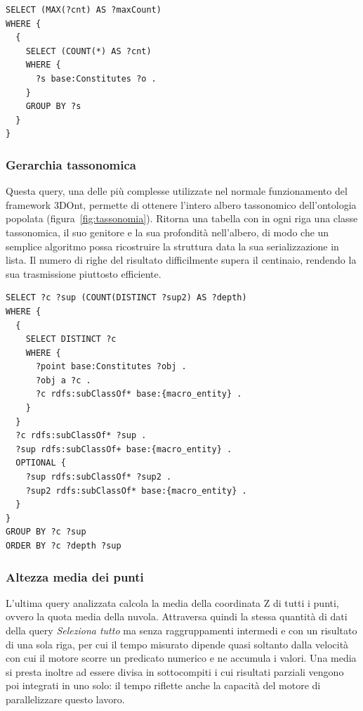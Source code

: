 \begin{lstlisting}[language=SPARQL]
SELECT (MAX(?cnt) AS ?maxCount)
WHERE {
  {
    SELECT (COUNT(*) AS ?cnt)
    WHERE {
      ?s base:Constitutes ?o .
    }
    GROUP BY ?s
  }
}
\end{lstlisting}

\subsubsection{Gerarchia tassonomica}

Questa query, una delle più complesse utilizzate nel normale funzionamento del framework 3DOnt, permette di ottenere
l'intero albero tassonomico dell'ontologia popolata (figura~\ref{fig:tassonomia}). Ritorna una tabella con in ogni riga una classe tassonomica,
il suo genitore e la sua profondità nell'albero, di modo che un semplice algoritmo possa ricostruire la struttura
data la sua serializzazione in lista.
Il numero di righe del risultato difficilmente supera il centinaio, rendendo la sua trasmissione piuttosto efficiente.

\begin{lstlisting}[language=SPARQL]
SELECT ?c ?sup (COUNT(DISTINCT ?sup2) AS ?depth)
WHERE {
  {
    SELECT DISTINCT ?c
    WHERE {
      ?point base:Constitutes ?obj .
      ?obj a ?c .
      ?c rdfs:subClassOf* base:{macro_entity} .
    }
  }
  ?c rdfs:subClassOf* ?sup .
  ?sup rdfs:subClassOf+ base:{macro_entity} .
  OPTIONAL {
    ?sup rdfs:subClassOf* ?sup2 .
    ?sup2 rdfs:subClassOf* base:{macro_entity} .
  }
}
GROUP BY ?c ?sup
ORDER BY ?c ?depth ?sup
\end{lstlisting}


\subsubsection{Altezza media dei punti}

L'ultima query analizzata calcola la media della coordinata Z di tutti i punti, ovvero la quota media della
nuvola. Attraversa quindi la stessa quantità di dati della query \emph{Seleziona tutto} ma senza raggruppamenti
intermedi e con un risultato di una sola riga, per cui il tempo misurato dipende quasi soltanto dalla
velocità con cui il motore scorre un predicato numerico e ne accumula i valori.
Una media si presta inoltre ad essere divisa in sottocompiti i cui risultati parziali vengono poi integrati
in uno solo: il tempo riflette anche la capacità del motore di parallelizzare questo lavoro.

